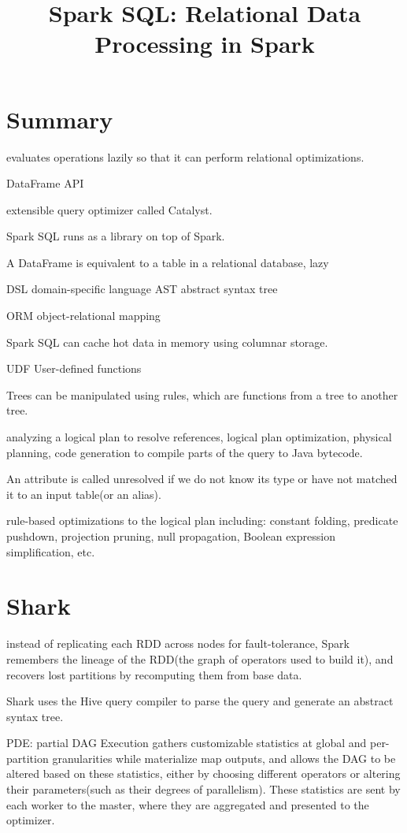 \documentclass[conference]{IEEEtran}
\begin{document}
	
	\title{Spark SQL: Relational Data Processing in Spark}	
	\maketitle
	\IEEEpeerreviewmaketitle	
	\section{Summary}
	evaluates operations lazily so that it can perform relational optimizations.
	
	DataFrame API
	
	extensible query optimizer called Catalyst.
	
	Spark SQL runs as a library on top of Spark.
	
	A DataFrame is equivalent to a table in a relational database, lazy
	
	DSL domain-specific language
	AST abstract syntax tree
	
	ORM object-relational mapping
	
	Spark SQL can cache hot data in memory using columnar storage.

	UDF User-defined functions

	Trees can be manipulated using rules, which are functions from a tree to another tree.
	
	analyzing a logical plan to resolve references, logical plan optimization, physical planning,
	code generation to compile parts of the query to Java bytecode. 
	
	An attribute is called unresolved if we do not know its type or have not matched it to an input table(or an alias).
	
	rule-based optimizations to the logical plan including: 
	constant folding, predicate pushdown, projection pruning, null propagation, Boolean expression simplification, etc.
	

	
	\section{Shark}
	instead of replicating each RDD across nodes for fault-tolerance, Spark remembers the lineage of the RDD(the graph of operators used to build it), and recovers lost partitions by recomputing them from base data.
	
	Shark uses the Hive query compiler to parse the query and generate an abstract syntax tree. 
	
	PDE: partial DAG Execution gathers customizable statistics at global and per-partition granularities while materialize map outputs, and allows the DAG to be altered based on these statistics, either by choosing different operators or altering their parameters(such as their degrees of parallelism). These statistics are sent by each worker to the master, where they are aggregated and presented to the optimizer.
	
\end{document}
